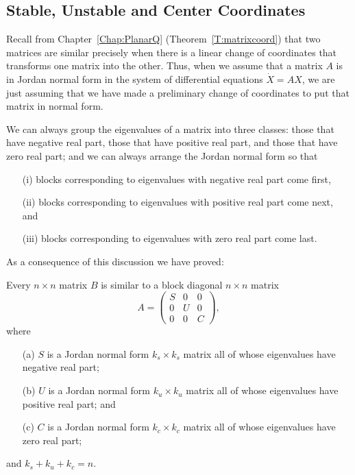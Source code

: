 \documentclass{ximera}
\begin{document}
\subsection*{Stable, Unstable and Center Coordinates}

Recall from Chapter~\ref{Chap:PlanarQ} (Theorem~\ref{T:matrixcoord}) that 
two matrices are similar 
precisely when there is a linear change of 
coordinates that transforms
one matrix into the other.  Thus, when we assume that a matrix $A$ is in 
Jordan normal form in the system of differential 
equations $\dot{X}=AX$, 
we are just assuming that we have made a preliminary change of coordinates
to put that matrix in normal form. 

We can always group the eigenvalues of a matrix into three classes: those 
that have negative real part, 
those that have positive real part, 
and those that have zero real part; and 
we can always arrange the Jordan normal form so 
that 
\begin{itemize}
\item[(i)] blocks corresponding to eigenvalues with negative real part come first,
\item[(ii)] blocks corresponding to eigenvalues with positive real part come 
next, and
\item[(iii)] blocks corresponding to eigenvalues with zero real part come last.
\end{itemize}
As a consequence of this discussion we have proved:
\begin{prop}  \label{P:SUC}
Every $n\times n$ matrix $B$ is similar to a 
block diagonal $n\times n$ matrix
\begin{equation} \label{e:SUC}
A = \left(\begin{array}{ccc} S & 0 & 0 \\ 0 & U & 0\\ 0 & 0 & C \end{array}
\right),
\end{equation}
where
\begin{itemize}
\item[(a)]	$S$ is a Jordan normal form
$k_s\times k_s$ matrix all of whose eigenvalues have negative real part;
\item[(b)]	$U$ is a Jordan normal form $k_u\times k_u$ matrix all
of whose eigenvalues have positive real part; and
\item[(c)]	$C$ is a Jordan normal form $k_c\times k_c$ matrix all
of whose eigenvalues have zero real part;
\end{itemize}
and $k_s+k_u+k_c=n$.
\end{prop}
\end{document}
